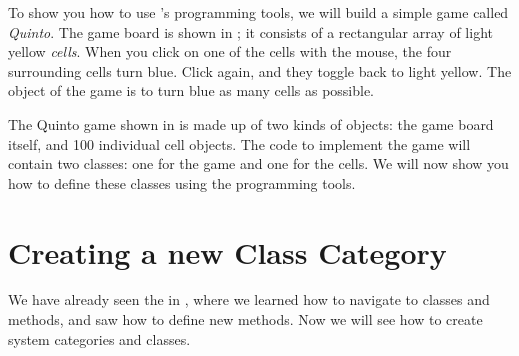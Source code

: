 \documentclass[a4paper,10pt,twoside]{book}
\begin{document}
To show you how to use \squeak's programming tools, we will build a simple game called \emph{Quinto}.
The game board is shown in ; it consists of a rectangular array of light yellow \emph{cells}.
When you click on one of the cells with the mouse, the four surrounding cells turn blue.
Click again, and they toggle back to light yellow.
The object of the game is to turn blue as many cells as possible.

The Quinto game shown in  is made up of two kinds of objects: the game board itself, and 100 individual cell objects.  The \squeak code to implement the game will contain two classes: one for the game and one for the cells.
We will now show you how to define these classes using the \squeak programming tools.

\section{Creating a new Class Category}

We have already seen the  in , where we learned how to navigate to classes and methods, and saw how to define new methods.
Now we will see how to create system categories and classes.

\end{document}
